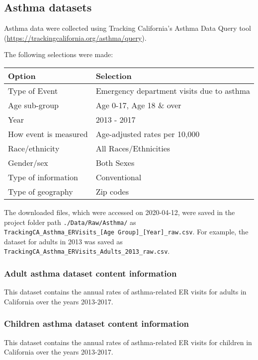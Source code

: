 \documentclass[12pt,]{article}
\begin{document}
\hypertarget{asthma-datasets}{%
\subsection{Asthma datasets}\label{asthma-datasets}}

Asthma data were collected using Tracking California's Asthma Data Query
tool (\url{https://trackingcalifornia.org/asthma/query}).

The following selections were made:

\begin{longtable}[]{@{}ll@{}}
\toprule
Option & Selection\tabularnewline
\midrule
\endhead
Type of Event & Emergency department visits due to asthma\tabularnewline
Age sub-group & Age 0-17, Age 18 \& over\tabularnewline
Year & 2013 - 2017\tabularnewline
How event is measured & Age-adjusted rates per 10,000\tabularnewline
Race/ethnicity & All Races/Ethnicities\tabularnewline
Gender/sex & Both Sexes\tabularnewline
Type of information & Conventional\tabularnewline
Type of geography & Zip codes\tabularnewline
\bottomrule
\end{longtable}

The downloaded files, which were accessed on 2020-04-12, were saved in
the project folder path \texttt{./Data/Raw/Asthma/} as
\texttt{TrackingCA\_Asthma\_ERVisits\_{[}Age\ Group{]}\_{[}Year{]}\_raw.csv}.
For example, the dataset for adults in 2013 was saved as
\texttt{TrackingCA\_Asthma\_ERVisits\_Adults\_2013\_raw.csv}.

\hypertarget{adult-asthma-dataset-content-information}{%
\subsubsection{Adult asthma dataset content
information}\label{adult-asthma-dataset-content-information}}

This dataset contains the annual rates of asthma-related ER visits for
adults in California over the years 2013-2017.

\hypertarget{children-asthma-dataset-content-information}{%
\subsubsection{Children asthma dataset content
information}\label{children-asthma-dataset-content-information}}

This dataset contains the annual rates of asthma-related ER visits for
children in California over the years 2013-2017.
\end{document}
